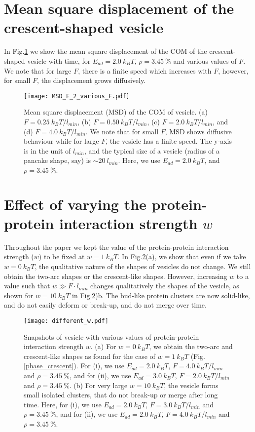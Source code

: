 \documentclass[pre,amsmath]{revtex4}
\begin{document}
\section{Mean square displacement of the crescent-shaped vesicle}
\label{sec:MSD}
In Fig.\ref{MSD} we show the mean square displacement of the COM of the crescent-shaped vesicle with time, for $E_{ad}=2.0 ~k_B T$, $\rho=3.45 ~\%$ and various values of $F$. We note that for large $F$, there is a finite speed which increases with $F$, however, for small $F$, the displacement grows diffusively. 
\begin{figure}[ht]
\centering
\texttt{[image: MSD\_E\_2\_various\_F.pdf]}
\caption{Mean square displacement (MSD) of the COM of vesicle. (a) $F=0.25 ~k_B T/l_{min}$, (b) $F=0.50 ~k_B T/l_{min}$, (c) $F=2.0 ~k_B T/l_{min}$, and (d) $F=4.0 ~k_B T/l_{min}$. We note that for small $F$, MSD shows diffusive behaviour while for large $F$, the vesicle has a finite speed. The y-axis is in the unit of $l_{min}$, and the typical size of a vesicle (radius of a pancake shape, say) is $\sim 20 ~ l_{min}$. Here, we use $E_{ad}=2.0~ k_B T$, and $\rho=3.45 ~\%$.}
\label{MSD} 
\end{figure}

\section{Effect of varying the protein-protein interaction strength $w$}
\label{sec:various_w}
Throughout the paper we kept the value of the protein-protein interaction strength ($w$) to be fixed at $w =1 ~k_B T$. In Fig.\ref{different_w}(a), we show that even if we take $w=0 ~ k_B T$, the qualitative nature of the shapes of vesicles do not change. We still obtain the two-arc shapes or the crescent-like shapes. However, increasing $w$ to a value such that $w\gg F\cdot l_{min}$ changes qualitatively the shapes of the vesicle, as shown for $w = 10 ~ k_B T$ in Fig.\ref{different_w})b. The bud-like protein clusters are now solid-like, and do not easily deform or break-up, and do not merge over time.
\begin{figure}[ht]
\centering
\texttt{[image: different\_w.pdf]}
\caption{Snapshots of vesicle with various values of protein-protein interaction strength $w$. (a) For $w=0 ~ k_B T$, we obtain the two-arc and crescent-like shapes as found for the case of $w=1~ k_B T$ (Fig.\ref{phase_crescent}). For (i), we use $E_{ad} = 2.0 ~ k_B T$, $F = 4.0 ~ k_B T/l_{min}$ and $\rho = 3.45 ~ \%$, and for (ii), we use $E_{ad} = 3.0 ~ k_B T$, $F = 2.0 ~ k_B T/l_{min}$ and $\rho = 3.45 ~ \%$. (b) For very large $w=10 ~ k_B T$, the vesicle forms small isolated clusters, that do not break-up or merge after long time. Here, for (i), we use $E_{ad} = 2.0 ~ k_B T$, $F = 3.0 ~ k_B T/l_{min}$ and $\rho = 3.45 ~ \%$, and for (ii), we use $E_{ad} = 2.0 ~ k_B T$, $F = 4.0 ~ k_B T/l_{min}$ and $\rho = 3.45 ~ \%$.}
\label{different_w} 
\end{figure}
\end{document}
